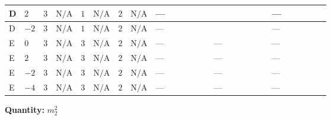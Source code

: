 \documentclass[8pt]{article}
\begin{document}
\begin{landscape}
\begin{longtable}{@{}llcccccc >{\raggedright\arraybackslash}p{0.21\linewidth} >{\raggedright\arraybackslash}p{0.21\linewidth} >{\raggedright\arraybackslash}p{0.21\linewidth}@{}}
D & $2$ & $3$ & $\text{N/A}$ & $1$ & $\text{N/A}$ & $2$ & $\text{N/A}$ & --- & \scriptsize\adjustbox{max width=\linewidth}{$\begin{gathered} +4 {\lambda_{S_2}^{(1)}} {m_2^2}\end{gathered}$} & --- \\
\midrule
D & $-2$ & $3$ & $\text{N/A}$ & $1$ & $\text{N/A}$ & $2$ & $\text{N/A}$ & --- & \scriptsize\adjustbox{max width=\linewidth}{$\begin{gathered} +4 {\lambda_{S_2}^{(1)}} {m_2^2}\end{gathered}$} & --- \\
\midrule
E & $0$ & $3$ & $\text{N/A}$ & $3$ & $\text{N/A}$ & $2$ & $\text{N/A}$ & --- & --- & --- \\
\midrule
E & $2$ & $3$ & $\text{N/A}$ & $3$ & $\text{N/A}$ & $2$ & $\text{N/A}$ & --- & --- & --- \\
\midrule
E & $-2$ & $3$ & $\text{N/A}$ & $3$ & $\text{N/A}$ & $2$ & $\text{N/A}$ & --- & --- & --- \\
\midrule
E & $-4$ & $3$ & $\text{N/A}$ & $3$ & $\text{N/A}$ & $2$ & $\text{N/A}$ & --- & --- & --- \\
\midrule
\bottomrule
\end{longtable}
\clearpage
\noindent\textbf{Quantity: }$m_2^2$\par\smallskip

\end{landscape}
\end{document}
